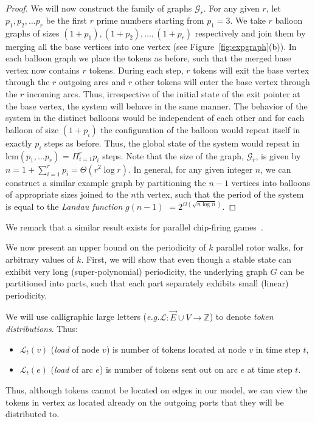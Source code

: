 \documentclass{article}[11pt,letter]
\newcommand{\eg}{{\it e.g.}\xspace}
\newcommand{\load}{\mathcal{L}}
\begin{document}
\begin{proof}
We will now construct the family of graphs $\mathcal{G}_r$. For any given $r$, let $p_1,p_2,\dots p_r$ be the first $r$ prime numbers starting from $p_1=3$. We take $r$ balloon graphs of sizes  $(1+p_1),(1+p_2),\dots,(1+p_r)$ respectively and join them by merging all the base vertices into one vertex (see Figure~\ref{fig:expgraph}(b)). In each balloon graph we place the tokens as before, such that the merged base vertex now contains $r$ tokens. During each step, $r$ tokens will exit the base vertex through the $r$ outgoing arcs and $r$ other tokens will enter the base vertex through the $r$ incoming arcs. Thus, irrespective of the initial state of the exit pointer at the base vertex, the system will behave in the same manner. The behavior of the system in the distinct balloons would be independent of each other and for each balloon of size $(1+p_i)$ the configuration of the balloon would repeat itself in exactly $p_i$ steps as before. Thus, the global state of the system would repeat in $\text{lcm}(p_1,\dots p_r)$ = $\Pi_{i=1}^{r}p_i$ steps. Note that the size of the graph, $\mathcal{G}_r$, is given by $n=1+\sum_{i=1}^{r}p_i = \Theta(r^2 \log{r})$. In general, for any given integer $n$, we can construct a similar example graph by partitioning the $n-1$ vertices into balloons of appropriate sizes joined to the $n$th vertex, such that the period of the system is equal to the \emph{Landau function} \cite{Landau} $g(n-1)$ $= 2^{\Omega(\sqrt{n\log{n}})}$.

\end{proof}


We remark that a similar result exists for parallel chip-firing games~\cite{Kiwi94nopolynomial}.



We now present an upper bound on the periodicity of $k$ parallel rotor walks, for arbitrary values of $k$.
First, we will show that even though a stable state can exhibit very long (super-polynomial) periodicity, the underlying graph $G$ can be partitioned into parts, such that each part separately exhibits small (linear) periodicity.

We will use calligraphic large letters (\eg $\load : \vec{E} \cup V \to \mathbb{Z}$) to denote \emph{token distributions}. Thus:
\begin{itemize}
\item $\load_t(v)$ (\emph{load} of node $v$) is number of tokens located at node $v$ in time step $t$,
\item $\load_t(e)$ (\emph{load} of arc $e$) is number of tokens sent out on arc $e$ at time step $t$.
\end{itemize}
Thus, although tokens cannot be located on edges in our model, we can view the tokens in vertex as located already on the outgoing ports that they will be distributed to.
\end{document}
